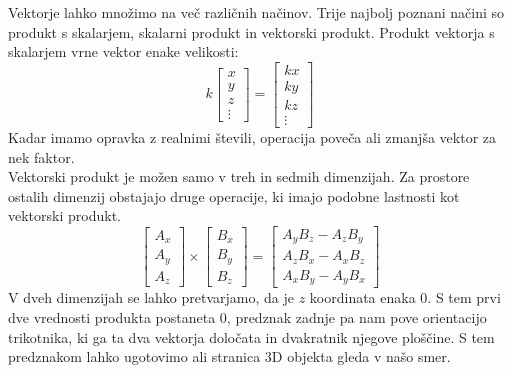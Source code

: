 \documentclass[a4paper, 12px]{article}
\begin{document}
    Vektorje lahko množimo na več različnih načinov. Trije najbolj poznani načini so produkt s skalarjem, 
    skalarni produkt in vektorski produkt. Produkt vektorja s skalarjem vrne vektor enake velikosti:
    $$k \begin{bmatrix}
        x \\ y \\ z \\ \vdots
    \end{bmatrix} = \begin{bmatrix}
        k x \\ k y \\ k z \\ \vdots
    \end{bmatrix}$$
    Kadar imamo opravka z realnimi števili, operacija poveča ali zmanjša vektor za nek faktor. \\

    Vektorski produkt je možen samo v treh in sedmih dimenzijah. Za prostore ostalih dimenzij obstajajo
    druge operacije, ki imajo podobne lastnosti kot vektorski produkt.
    $$\begin{bmatrix}
        A_x \\ A_y \\ A_z
    \end{bmatrix} \times \begin{bmatrix}
        B_x \\ B_y \\ B_z
    \end{bmatrix} = \begin{bmatrix}
        A_y B_z - A_z B_y \\ A_z B_x - A_x B_z \\ A_x B_y - A_y B_x
    \end{bmatrix}$$
    V dveh dimenzijah se lahko pretvarjamo, da je $z$ koordinata enaka $0$. S tem prvi dve vrednosti
    produkta postaneta $0$, predznak zadnje pa nam pove orientacijo trikotnika, ki ga ta dva vektorja 
    določata in dvakratnik njegove ploščine. S tem predznakom lahko ugotovimo ali stranica 3D objekta gleda v našo smer.
    \cite{CrossProdWiki}
\end{document}
